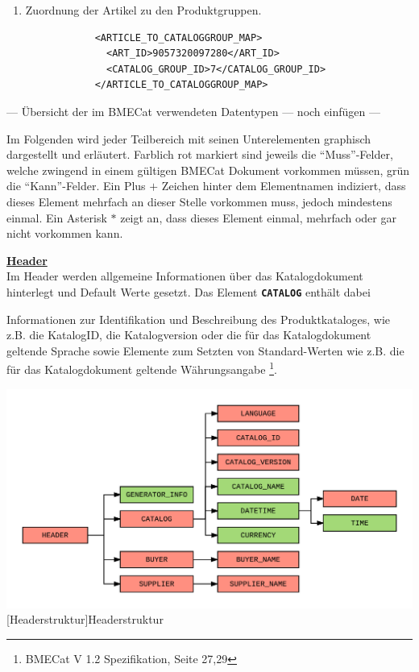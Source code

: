 \begin{enumerate}
	
			\item Zuordnung der Artikel zu den Produktgruppen.
			\begin{lstlisting}
			<ARTICLE_TO_CATALOGGROUP_MAP>
			  <ART_ID>9057320097280</ART_ID>
			  <CATALOG_GROUP_ID>7</CATALOG_GROUP_ID>
			</ARTICLE_TO_CATALOGGROUP_MAP>
			\end{lstlisting}
		
		\end{enumerate}
		
	--- Übersicht der im BMECat verwendeten Datentypen --- noch einfügen ---
	
	Im Folgenden wird jeder Teilbereich mit seinen Unterelementen graphisch dargestellt und erläutert. Farblich rot markiert sind jeweils die \enquote{Muss}-Felder, welche zwingend in einem gültigen BMECat Dokument vorkommen müssen, grün die \enquote{Kann}-Felder. Ein Plus \(+\) Zeichen hinter dem Elementnamen indiziert, dass dieses Element mehrfach an dieser Stelle vorkommen muss, jedoch mindestens einmal. Ein Asterisk \(*\) zeigt an, dass dieses Element einmal, mehrfach oder gar nicht vorkommen kann.  
	
	\textbf{\underline{Header}}\\
	Im Header werden allgemeine Informationen über das Katalogdokument hinterlegt und
	 Default Werte gesetzt. Das Element \texttt{\textbf{CATALOG}} enthält dabei %
	
	Informationen zur Identifikation und Beschreibung des Produktkataloges, wie z.B. die
	 Katalog\-ID, die Katalogversion oder die für das Katalogdokument geltende Sprache sowie
	  Elemente zum Setzten von Standard-Werten wie z.B. die für das Katalogdokument geltende Währungsangabe \footnote{BMECat V 1.2 Spezifikation, Seite 27,29}.
	
	\begin{minipage}{\linewidth}
		\vspace{1em}
		\centering
		\includegraphics[width=0.85\linewidth]{img/BMECat_Header}
		[Headerstruktur]{Headerstruktur}
		\label{fig:header}
		\vspace{1em}
	\end{minipage}
	
